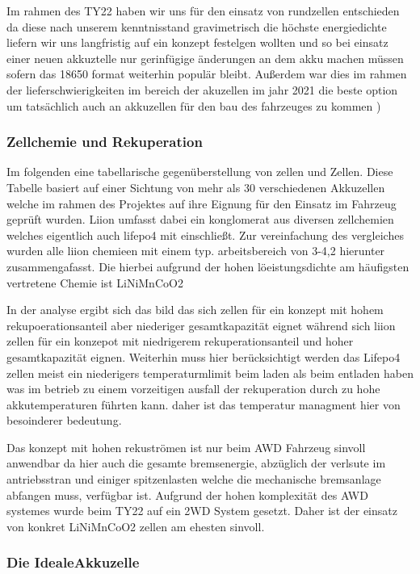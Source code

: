 Im rahmen des TY22 haben wir uns für den einsatz von rundzellen entschieden da diese nach unserem kenntnisstand gravimetrisch die höchste energiedichte liefern wir uns langfristig auf ein konzept festelgen wollten und so bei einsatz einer neuen akkuztelle nur gerinfügige änderungen an dem akku machen müssen sofern das 18650 format weiterhin populär bleibt. Außerdem war dies im rahmen der lieferschwierigkeiten im bereich der akuzellen im jahr 2021 die beste option um tatsächlich auch an akkuzellen für den bau des fahrzeuges zu kommen
)

\subsubsection{Zellchemie und Rekuperation}

Im folgenden eine tabellarische gegenüberstellung von  zellen und  Zellen. Diese Tabelle basiert auf einer Sichtung von mehr als 30 verschiedenen Akkuzellen welche im rahmen des Projektes auf ihre Eignung für den Einsatz im Fahrzeug geprüft wurden. Liion umfasst dabei ein konglomerat aus diversen zellchemien welches eigentlich auch lifepo4 mit einschließt. Zur vereinfachung des vergleiches wurden alle liion chemieen mit einem typ. arbeitsbereich von 3-4,2 hierunter zusammengafasst. Die hierbei aufgrund der hohen löeistungsdichte am häufigsten vertretene Chemie ist LiNiMnCoO2



In der analyse ergibt sich das bild das sich  zellen für ein konzept mit hohem rekupoerationsanteil aber niederiger gesamtkapazität eignet während sich liion zellen für ein konzepot mit niedrigerem rekuperationsanteil und hoher gesamtkapazität eignen. Weiterhin muss hier berücksichtigt werden das Lifepo4 zellen meist ein niederigers temperaturmlimit beim laden als beim entladen haben was im betrieb zu einem vorzeitigen ausfall der rekuperation durch zu hohe akkutemperaturen führten kann. daher ist das temperatur managment hier von besoinderer bedeutung.

Das konzept mit hohen rekuströmen ist nur beim AWD Fahrzeug sinvoll anwendbar da hier auch die gesamte bremsenergie, abzüglich der verlsute im antriebsstran und einiger spitzenlasten welche die mechanische bremsanlage abfangen muss, verfügbar ist. Aufgrund der hohen komplexität des AWD systemes wurde beim TY22 auf ein 2WD System gesetzt. Daher ist der einsatz von konkret LiNiMnCoO2 zellen am ehesten sinvoll.

\subsubsection{Die \glqq Ideale\grqq Akkuzelle}

